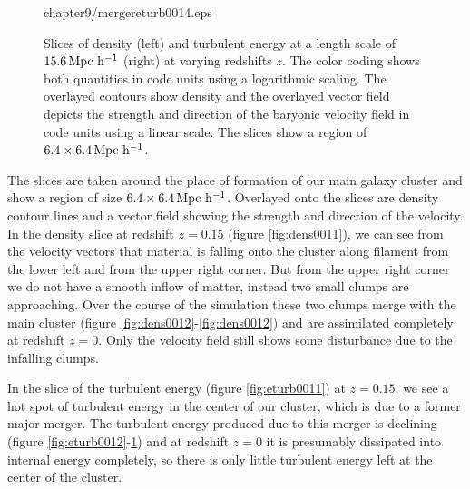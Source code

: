\begin{figure}[tp]
{{chapter9/mergereturb0014.eps}
\label{fig:eturb0014}}
\caption{Slices of density (left) and turbulent energy at a length scale of
$\unit[15.6] {Mpc\ h^{-1}}$ (right) at varying redshifts $z$. The color coding
shows both quantities in code units using a logarithmic scaling. The overlayed
contours show density and the overlayed vector field depicts the strength and
direction of the baryonic velocity field in code units using a linear scale. The
slices show a region of $\unit[6.4 \times 6.4] {Mpc\ h^{-1}}$. }
\end{figure}
The slices are taken around the place of
formation of our main galaxy cluster and show a region of size 
$\unit[6.4 \times 6.4] {Mpc\ h^{-1}}$. Overlayed onto the slices are density
contour lines and a vector field showing the strength and direction of
the velocity. In the density slice at redshift $z=0.15$
(figure \ref{fig:dens0011}), we can see from the velocity vectors that material
is falling onto the cluster along filament from the lower left and from the
upper right corner. But from the upper right corner we do not have a smooth
inflow of matter, instead two small clumps are approaching. Over the course of
the simulation these two clumps merge with the main cluster
(figure \ref{fig:dens0012}-\ref{fig:dens0012}) and are assimilated completely
at redshift $z=0$. Only the velocity field still shows some disturbance
due to the infalling clumps.  

In the slice of the turbulent energy (figure \ref{fig:eturb0011}) at $z=0.15$,
we see a hot spot of turbulent energy in the center of our cluster, which is due
to a former major merger. The turbulent energy produced due to this merger is
declining (figure \ref{fig:eturb0012}-\ref{fig:eturb0014}) and at redshift
$z=0$ it is presumably dissipated into internal energy completely, so there
is only little turbulent energy left at the center of the cluster. 

